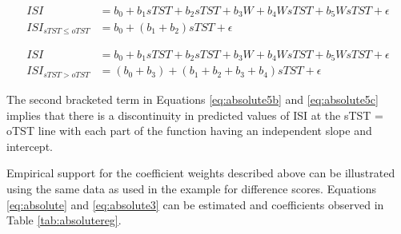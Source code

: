 \documentclass[
]{article}
\begin{document}
\begin{equation}
\begin{split}
ISI & = b_{0} + b_{1}sTST + b_{2}sTST + b_{3}W + b_{4}W sTST + b_{5}W sTST + \epsilon \\
ISI_{sTST \le oTST} & = b_{0} + (b_{1} + b_{2})sTST + \epsilon
\end{split}
\label{eq:absolute5b}
\end{equation}

\begin{equation}
\begin{split}
ISI & = b_{0} + b_{1}sTST + b_{2}sTST + b_{3}W + b_{4}W sTST + b_{5}W sTST + \epsilon \\
ISI_{sTST > oTST} & = (b_{0} + b_{3}) + (b_{1} + b_{2} + b_{3} + b_{4})sTST + \epsilon
\end{split}
\label{eq:absolute5c}
\end{equation}

The second bracketed term in Equations \eqref{eq:absolute5b} and \eqref{eq:absolute5c} implies that there is a discontinuity in predicted values of ISI at the sTST = oTST line with each part of the function having an independent slope and intercept.

Empirical support for the coefficient weights described above can be illustrated using the same data as used in the example for difference scores. Equations \eqref{eq:absolute} and \eqref{eq:absolute3} can be estimated and coefficients observed in Table \ref{tab:absolutereg}.
\end{document}
